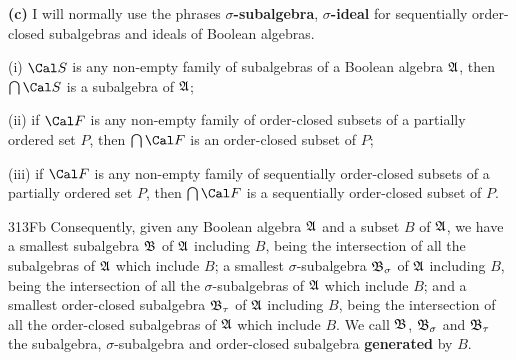 




\medskip

{\bf (c)} I will normally use the phrases {\bf $\sigma$-subalgebra},
{\bf $\sigma$-ideal} for sequentially order-closed subalgebras and
ideals of Boolean algebras.

(i)  $\Cal S$ is any non-empty family of subalgebras of a
Boolean algebra $\frak A$, then $\bigcap\Cal S$ is a subalgebra of
$\frak A$;

(ii) if $\Cal F$ is any non-empty family of order-closed subsets of a
partially ordered set $P$, then $\bigcap\Cal F$ is an order-closed
subset of $P$;

(iii) if $\Cal F$ is any non-empty family of sequentially order-closed
subsets of a partially ordered set $P$, then $\bigcap\Cal F$ is a
sequentially order-closed subset of $P$.

\spheader 313Fb Consequently, given any Boolean algebra $\frak A$ and a
subset $B$ of $\frak A$, we have a smallest subalgebra $\frak B$ of
$\frak A$ including $B$, being the intersection of all the subalgebras
of $\frak A$ which include $B$;
a smallest $\sigma$-subalgebra $\frak B_{\sigma}$ of $\frak A$ including
$B$, being the intersection of all the $\sigma$-subalgebras of $\frak A$
which include $B$;
and a smallest order-closed subalgebra $\frak B_{\tau}$ of $\frak A$
including $B$, being the intersection of all the order-closed
subalgebras of $\frak A$ which include $B$.
We call $\frak B$, $\frak B_{\sigma}$ and $\frak B_{\tau}$ the
subalgebra, $\sigma$-subalgebra and order-closed subalgebra {\bf
generated} by $B$.   

